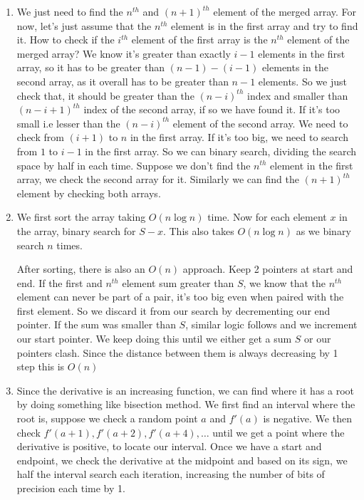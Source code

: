 \documentclass[12pt]{report}
\begin{document}
\begin{enumerate}[label=\textbf{\arabic*.}]
    \item We just need to find the $n^{th}$ and $(n+1)^{th}$ element of the merged array. For now, let's just assume 
    that the $n^{th}$ element is in the first array and try to find it. How to check if the $i^{th}$ element of the 
    first array is the $n^{th}$ element of the merged array? We know it's greater than exactly $i-1$ elements in the
    first array, so it has to be greater than $(n-1)-(i-1)$ elements in the second array, as it overall has to be greater
    than $n-1$ elements. So we just check that, it should be greater than the $(n-i)^{th}$ index and smaller than $(n-i+1)^{th}$
    index of the second array, if so we have found it. If it's too small i.e lesser than the $(n-i)^{th}$ element of 
    the second array. We need to check from $(i+1)$ to $n$ in the first array. If it's too big, we need to search from $1$ to 
    $i-1$ in the first array. So we can binary search, dividing the search space by half in each time. Suppose we don't
    find the $n^{th}$ element in the first array, we check the second array for it. Similarly we can find the $(n+1)^{th}$
    element by checking both arrays.

    \item We first sort the array taking $O(n \log n)$ time. Now for each element $x$ in the array, binary search for $S-x$.
    This also takes $O(n \log n)$ as we binary search $n$ times.
    
    After sorting, there is also an $O(n)$ approach. Keep 2 pointers at start and end. If the first and $n^{th}$ element
    sum greater than $S$, we know that the $n^{th}$ element can never be part of a pair, it's too big even when paired 
    with the first element. So we discard it from our search by decrementing our end pointer. If the sum was smaller than 
    $S$, similar logic follows and we increment our start pointer. We keep doing this until we either get a sum $S$ or 
    our pointers clash. Since the distance between them is always decreasing by 1 step this is $O(n)$

    \item Since the derivative is an increasing function, we can find where it has a root by doing something like bisection
    method. We first find an interval where the root is, suppose we check a random point $a$ and $f'(a)$ is negative.
    We then check $f'(a+1), f'(a+2), f'(a+4), \dots$ until we get a point where the derivative is positive, to
    locate our interval. Once we have a start and endpoint, we check the derivative at the midpoint and based on 
    its sign, we half the interval search each iteration, increasing the number of bits of precision each time by 1.


\end{enumerate}
\end{document}
